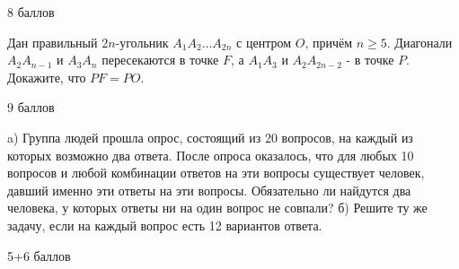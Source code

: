 \begin{flushright}
        \scriptsize{8 баллов}
\end{flushright}

\newpage

\hspace{3mm}

Дан правильный $2 n$-угольник $A_1 A_2 \ldots A_{2 n}$ с центром $O$, причём $n \geq 5$. Диагонали $A_2 A_{n-1}$ и $A_3 A_n$ пересекаются в точке $F$, а $A_1 A_3$ и $A_2 A_{2 n-2}$ - в точке $P$. Докажите, что $P F=P O$.


\begin{flushright}
        \scriptsize{9 баллов}
\end{flushright}

a) Группа людей прошла опрос, состоящий из 20 вопросов, на каждый из которых возможно два ответа. После опроса оказалось, что для любых 10 вопросов и любой комбинации ответов на эти вопросы существует человек, давший именно эти ответы на эти вопросы. Обязательно ли найдутся два человека, у которых ответы ни на один вопрос не совпали?
б) Решите ту же задачу, если на каждый вопрос есть 12 вариантов ответа.

\begin{flushright}
        \scriptsize{5+6 баллов}
\end{flushright}